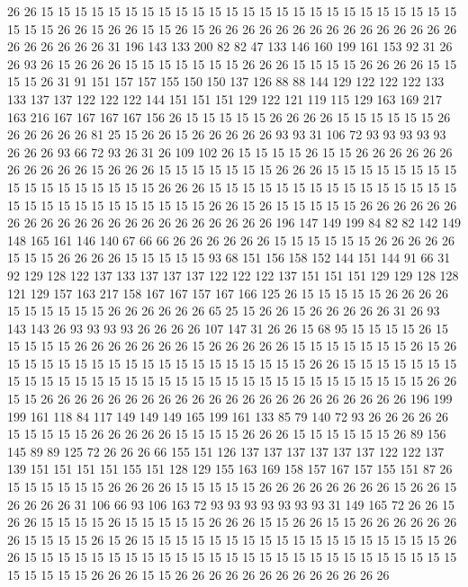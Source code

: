 26 26 15 15 15 15 15 15 15 15 15 15 15 15 15 15 15 15 15 15
15 15 15 15 15 15 15 15 15 15 26 26 15 26 26 15 15 26 15 26
26 26 26 26 26 26 26 26 26 26 26 26 26 26 26 26 26 26 26 26
31 196 143 133 200 82 82 47 133 146 160 199 161 153 92 31 26 26 93 26
15 26 26 26 15 15 15 15 15 15 15 26 26 26 15 15 15 15 26 26
26 26 15 15 15 15 26 31 91 151 157 157 155 150 150 137 126 88 88 144
129 122 122 122 133 133 137 137 122 122 122 144 151 151 151 129 122 121 119 115
129 163 169 217 163 216 167 167 167 167 156 26 15 15 15 15 15 26 26 26
26 15 15 15 15 15 15 26 26 26 26 26 26 81 25 15 26 26 15 26
26 26 26 26 93 93 31 106 72 93 93 93 93 93 26 26 26 93 66 72
93 26 31 26 109 102 26 15 15 15 15 26 15 15 26 26 26 26 26 26
26 26 26 26 26 15 26 26 26 15 15 15 15 15 15 15 26 26 26 15
15 15 15 15 15 15 15 15 15 15 15 15 15 15 15 15 26 26 26 15
15 15 15 15 15 15 15 15 15 15 15 15 15 15 15 15 15 15 15 15
15 15 15 15 15 15 26 26 15 26 15 15 15 15 15 26 26 26 26 26
26 26 26 26 26 26 26 26 26 26 26 26 26 26 26 26 26 196 147 149
199 84 82 82 142 149 148 165 161 146 140 67 66 66 26 26 26 26 26 26
15 15 15 15 15 15 26 26 26 26 26 15 15 15 26 26 26 26 15 15
15 15 15 93 68 151 156 158 152 144 151 144 91 66 31 92 129 128 122 137
133 137 137 137 122 122 122 137 151 151 151 129 129 128 128 121 129 157 163 217
158 167 167 157 167 166 125 26 15 15 15 15 15 26 26 26 26 15 15 15
15 15 15 26 26 26 26 26 26 65 25 15 26 26 15 26 26 26 26 26
31 26 93 143 143 26 93 93 93 93 26 26 26 26 107 147 31 26 26 15
68 95 15 15 15 15 26 15 15 15 15 15 26 26 26 26 26 26 26 15
26 26 26 26 26 15 15 15 15 15 15 15 26 15 26 15 15 15 15 15
15 15 15 15 15 15 15 15 15 15 15 15 15 26 26 15 15 15 15 15
15 15 15 15 15 15 15 15 15 15 15 15 15 15 15 15 15 15 15 15
15 15 15 15 15 15 15 26 26 15 15 26 26 26 26 26 26 26 26 26
26 26 26 26 26 26 26 26 26 26 26 26 26 196 199 199 161 118 84 117
149 149 149 165 199 161 133 85 79 140 72 93 26 26 26 26 26 15 15 15
15 15 26 26 26 26 26 15 15 15 15 26 26 26 15 15 15 15 15 15
26 89 156 145 89 89 125 72 26 26 26 66 155 151 126 137 137 137 137 137
137 122 122 137 139 151 151 151 151 155 151 128 129 155 163 169 158 157 167 157
155 151 87 26 15 15 15 15 15 15 26 26 26 26 15 15 15 15 15 26
26 26 26 26 26 26 26 15 26 26 15 26 26 26 26 31 106 66 93 106
163 72 93 93 93 93 93 93 93 31 149 165 72 26 26 15 26 26 15 15
15 15 26 15 15 15 15 15 26 26 26 15 15 26 26 15 15 26 26 26
26 26 26 26 15 15 15 15 26 15 26 15 15 15 15 15 15 15 15 15
15 15 15 15 15 15 15 15 15 26 26 15 15 15 15 15 15 15 15 15
15 15 15 15 15 15 15 15 15 15 15 15 15 15 15 15 15 15 15 15
15 15 26 26 26 15 15 26 26 26 26 26 26 26 26 26 26 26 26 26
